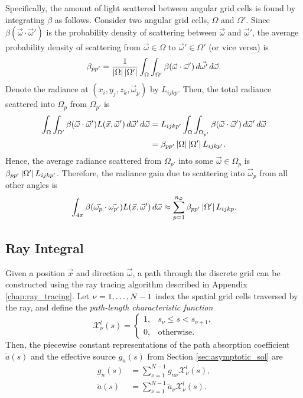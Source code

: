 Specifically, the amount of light scattered between angular grid cells is found by integrating $\beta$ as follows.
Consider two angular grid cells, $\Omega$ and $\Omega'$.
Since $\beta(\vec{\omega}\cdot\vec{\omega}')$ is the probability density of scattering between $\vec{\omega}$ and $\vec{\omega}'$, the average probability density of scattering from $\vec{\omega} \in \Omega$ to $\vec{\omega}' \in \Omega'$ (or vice versa) is
\begin{equation*}
  \beta_{pp'} = \frac{1}{\left| \Omega \right|\left| \Omega' \right|} \int_\Omega\int_{\Omega'}\beta(\vec{\omega}\cdot\vec{\omega}')\, d\vec{\omega'}\, d\vec{\omega}.
\end{equation*}
Denote the radiance at $(x_i, y_j, z_k, \vec{\omega}_p)$ by $L_{ijkp}$.
Then, the total radiance scattered into $\Omega_p$ from $\Omega_{p'}$ is
\begin{align*}
  \int_{\Omega}\int_{\Omega'}\beta(\vec{\omega} \cdot \vec{\omega}')L(\vec{x},\vec{\omega}')\, d\vec{\omega}'\, d\vec{\omega}
  &= L_{ijkp'} \int_\Omega\int_{\Omega_{p'}} \beta(\vec{\omega} \cdot \vec{\omega}')\, d\vec{\omega}'\, d\vec{\omega} \\
  &= \beta_{pp'}\left| \Omega \right|\left| \Omega' \right|L_{ijkp'}.
\end{align*}
Hence, the average radiance scattered from $\Omega_{p'}$ into some $\vec{\omega} \in \Omega_p$ is $\beta_{pp'}\left| \Omega' \right|L_{ijkp'}$.
Therefore, the radiance gain due to scattering into $\vec{\omega}_p$ from all other angles is
\begin{equation}
  \int_{4\pi}\beta(\vec{\omega_p}\cdot\vec{\omega_{p'}})L(\vec{x}, \vec{\omega}')\, d\vec{\omega} \approx \sum_{p=1}^{n_{\vec{\omega}}} \beta_{pp'}\left| \Omega' \right|L_{ijkp}.
  \label{eqn:scatter_integral}
\end{equation}

\subsection{Ray Integral}
Given a position $\vec{x}$ and direction $\vec{\omega}$, a path through the discrete grid can be constructed using the ray tracing algorithm described in Appendix \ref{chap:ray_tracing}.
Let $\nu=1,\ldots,N\nobreak-\nobreak1$ index the spatial grid cells traversed by the ray, and define the \textit{path-length characteristic function}
\begin{equation*}
  \mathcal{X}^l_\nu(s) = \begin{cases}
    1, & s_\nu \leq s < s_{\nu+1}, \\
    0, & \mbox{otherwise}.
    \end{cases}
\end{equation*}
Then, the piecewise constant representations of the path absorption coefficient $\tilde{a}(s)$ and the effective source $g_n(s)$ from Section \ref{sec:asymptotic_sol} are
\begin{align*}
  g_n(s) &= \sum_{\nu=1}^{N-1}g_{n\nu}\mathcal{X}^l_\nu(s), \\
  \tilde{a}(s) &= \sum_{\nu=1}^{N-1}\tilde{a}_{\nu}\mathcal{X}^l_\nu(s).
\end{align*}

